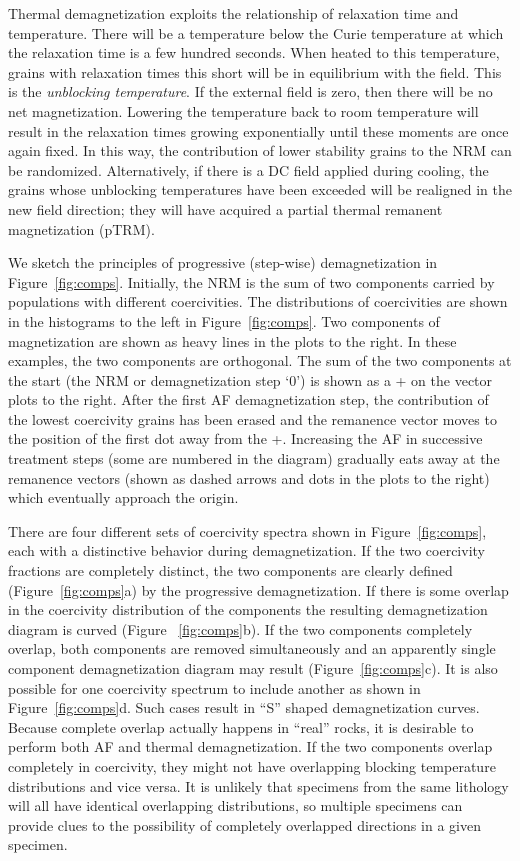 Thermal demagnetization exploits the relationship of relaxation time and temperature.  There will be a temperature below the Curie temperature at which the relaxation time is a few hundred seconds.  When heated to this temperature, grains with relaxation times this short will be in equilibrium with the field.  This is the {\it unblocking temperature}.  If the external field is zero, then there will be no net magnetization.  Lowering the temperature back to room temperature will result in the relaxation times growing exponentially until these moments are once again fixed.  In this way, the contribution of lower stability grains to the NRM can be randomized.  Alternatively, if there is a DC field applied during cooling, the grains whose unblocking temperatures have been exceeded will be realigned in the new field direction;  they will have acquired a partial thermal remanent magnetization (pTRM).  


We sketch the principles of progressive 
(step-wise) demagnetization in
Figure~\ref{fig:comps}.  Initially, the NRM is the sum 
of two components carried by populations with different coercivities.
The distributions of coercivities are shown in the histograms to the
left in Figure~\ref{fig:comps}.  Two components of magnetization
 are shown as heavy lines
in the plots to the right.  In these examples, the two components are
orthogonal.  The sum of the two components at the start (the NRM or demagnetization step `0') is shown as a
+ on the vector plots to the right.  
After the first AF demagnetization step, the contribution
of the lowest coercivity grains has been erased and the remanence
vector moves to the position of the first dot away from the +.
  Increasing the AF in successive treatment steps (some are numbered in the diagram)
gradually eats away at  the remanence vectors (shown as dashed
arrows and dots in the plots to the right) which eventually
approach
the origin.  

There are four different sets of coercivity spectra shown in Figure~\ref{fig:comps},
each with a distinctive behavior during demagnetization.
If the two coercivity fractions are completely distinct, the
two components are clearly defined (Figure~\ref{fig:comps}a) by the
progressive demagnetization. 
If there is some overlap in the coercivity distribution of the
components the resulting demagnetization 
diagram is curved (Figure ~\ref{fig:comps}b).
If the two components completely overlap, both components are removed
simultaneously and an apparently single component demagnetization diagram 
may result (Figure~\ref{fig:comps}c). 
It is also possible for one 
coercivity spectrum to include another as shown in Figure~\ref{fig:comps}d.  Such  cases result in ``S'' shaped demagnetization curves.
 Because complete overlap actually happens in ``real''
rocks, it is desirable to perform both AF and thermal demagnetization. If the
two components overlap completely in coercivity, they might not
have overlapping  blocking temperature distributions and vice versa.   
It is unlikely that specimens from the same lithology will all have identical 
overlapping distributions, so multiple specimens can 
provide clues to the possibility of  completely 
overlapped directions in a given
specimen.


